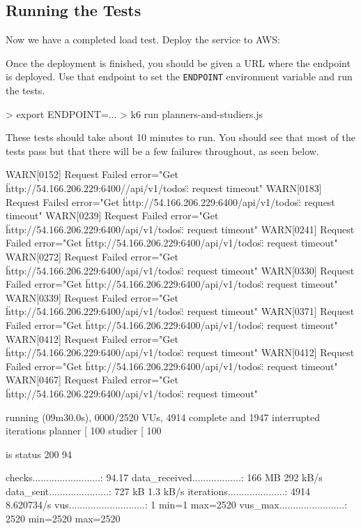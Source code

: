 \documentclass{csse4400}
\begin{document}
\subsection{Running the Tests}

Now we have a completed load test.
Deploy the service to AWS:


Once the deployment is finished,
you should be given a URL where the endpoint is deployed.
Use that endpoint to set the \texttt{ENDPOINT} environment variable and run the tests.

\begin{code}[language=bash,numbers=none]{}
> export ENDPOINT=...
> k6 run planners-and-studiers.js
\end{code}

These tests should take about 10 minutes to run.
You should see that most of the tests pass but that there will be a few failures throughout,
as seen below.

\begin{code}[language=bash,numbers=none]{}
WARN[0152] Request Failed                                error="Get \"http://54.166.206.229:6400//api/v1/todos\": request timeout"
WARN[0183] Request Failed                                error="Get \"http://54.166.206.229:6400/api/v1/todos\": request timeout"
WARN[0239] Request Failed                                error="Get \"http://54.166.206.229:6400/api/v1/todos\": request timeout"
WARN[0241] Request Failed                                error="Get \"http://54.166.206.229:6400/api/v1/todos\": request timeout"
WARN[0272] Request Failed                                error="Get \"http://54.166.206.229:6400/api/v1/todos\": request timeout"
WARN[0330] Request Failed                                error="Get \"http://54.166.206.229:6400/api/v1/todos\": request timeout"
WARN[0339] Request Failed                                error="Get \"http://54.166.206.229:6400/api/v1/todos\": request timeout"
WARN[0371] Request Failed                                error="Get \"http://54.166.206.229:6400/api/v1/todos\": request timeout"
WARN[0412] Request Failed                                error="Get \"http://54.166.206.229:6400/api/v1/todos\": request timeout"
WARN[0412] Request Failed                                error="Get \"http://54.166.206.229:6400/api/v1/todos\": request timeout"
WARN[0467] Request Failed                                error="Get \"http://54.166.206.229:6400/api/v1/todos\": request timeout"

running (09m30.0s), 0000/2520 VUs, 4914 complete and 1947 interrupted iterations
planner  [ 100%
studier  [ 100%

      is status 200
       94%

     checks.........................: 94.17%
     data_received..................: 166 MB 292 kB/s
     data_sent......................: 727 kB 1.3 kB/s
     iterations.....................: 4914   8.620734/s
     vus............................: 1      min=1       max=2520
     vus_max........................: 2520   min=2520    max=2520
\end{code}
\end{document}
